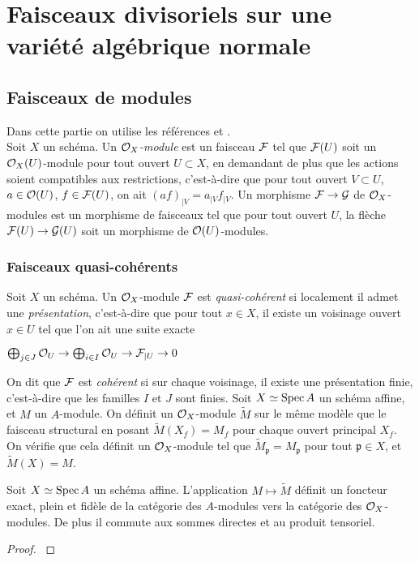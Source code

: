 \chapter{Faisceaux divisoriels sur une variété algébrique normale}


\section{Faisceaux de modules}

\noindent Dans cette partie on utilise les références \cite{QingLiu} et \cite{Hartshorne}.\\

Soit $X$ un schéma. Un \textit{$\mathcal{O}_X$-module} est un faisceau $\mathcal{F}$ tel que $\mathcal{F}(U)$ soit un $\mathcal{O}_X(U)$-module pour tout ouvert $U\subset X$, en demandant de plus que les actions soient compatibles aux restrictions, c'est-à-dire que pour tout ouvert $V\subset U$, $a\in\mathcal{O}(U)$, $f\in \mathcal{F}(U)$, on ait $(af)_{|V}=a_{|V}f_{|V}$. Un morphisme $\mathcal{F}\rightarrow\mathcal{G}$ de $\mathcal{O}_X$-modules est un morphisme de faisceaux tel que pour tout ouvert $U$, la flèche $\mathcal{F}(U)\rightarrow\mathcal{G}(U)$ soit un morphisme de $\mathcal{O}(U)$-modules. 

\subsection{Faisceaux quasi-cohérents}

Soit $X$ un schéma. Un $\mathcal{O}_X$-module $\mathcal{F}$ est \textit{quasi-cohérent} si localement il admet une \textit{présentation}, c'est-à-dire que pour tout $x\in X$, il existe un voisinage ouvert $x\in U$ tel que l'on ait une suite exacte
\begin{center}
$\bigoplus_{j\in J}\mathcal{O}_{U}\rightarrow\bigoplus_{i\in I}\mathcal{O}_{U}\rightarrow \mathcal{F}_{|U}\rightarrow 0$
\end{center}

On dit que $\mathcal{F}$ est \textit{cohérent} si sur chaque voisinage, il existe une présentation finie, c'est-à-dire que les familles $I$ et $J$ sont finies.
Soit $X\simeq \operatorname{Spec} A$ un schéma affine, et $M$ un $A$-module. On définit un $\mathcal{O}_X$-module $\widetilde{M}$ sur le même modèle que le faisceau structural en posant $\widetilde{M}(X_f)=M_f$ pour chaque ouvert principal $X_f$. On vérifie que cela définit un $\mathcal{O}_X$-module tel que $\widetilde{M}_\mathfrak{p}=M_\mathfrak{p}$ pour tout $\mathfrak{p}\in X$, et $\widetilde{M}(X)=M$.


\begin{prop}
Soit $X\simeq\operatorname{Spec} A$ un schéma affine. L'application $M\mapsto \widetilde{M}$ définit un foncteur exact, plein et fidèle de la catégorie des $A$-modules vers la catégorie des $\mathcal{O}_X$-modules. De plus il commute aux sommes directes et au produit tensoriel.
\end{prop}
\begin{proof}
\cite[II.5.2]{Hartshorne}
\end{proof}


